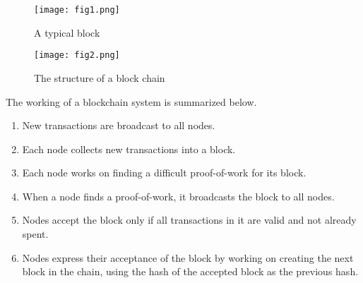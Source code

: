 \begin{figure}[!htb]
   \begin{minipage}{0.25\textwidth}   
     \centering
     \texttt{[image: fig1.png]}
     \caption{A typical block}
     \label{Fig:1}
   \end{minipage}\hfill
   \begin{minipage}{0.65\textwidth}
     \centering
     \texttt{[image: fig2.png]}
     \caption{The structure of a block chain\cite{bcpic}}
     \label{Fig:2}
   \end{minipage}\hfill
\end{figure}

The working of a blockchain system is summarized below.
\begin{enumerate}
\item New transactions are broadcast to all nodes.
\item Each node collects new transactions into a block.
\item Each node works on finding a difficult proof-of-work for its block.
\item When a node finds a proof-of-work, it broadcasts the block to all nodes.
\item Nodes accept the block only if all transactions in it are valid and not already spent.
\item Nodes express their acceptance of the block by working on creating the next block in the
chain, using the hash of the accepted block as the previous hash.
\end{enumerate}

